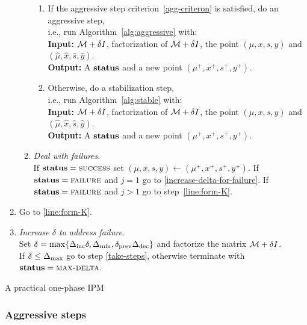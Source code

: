 \documentclass{article}
\begin{document}
\begin{algorithm}[H]
\begin{enumerate}[label*=A.{\arabic*}]
\begin{enumerate}[label*=.{\arabic*}]
\begin{enumerate}[label=-Case {\Roman*}]
\item If the aggressive step criterion~\eqref{agg-criteron} is satisfied, do an aggressive step, \\
i.e., run Algorithm~\ref{alg:aggressive} with: \\
\hspace*{0.1cm}  \textbf{Input:} $\mathcal{M} + \delta I$, factorization of $\mathcal{M} + \delta I$, the point $(\mu, x, s, y)$ and $(\hat{\mu}, \hat{x}, \hat{s}, \hat{y})$. \\
\hspace*{0.1cm}  \textbf{Output:} A $\textbf{status}$ and a new point $(\mu^{+},x^{+},s^{+},y^{+})$.
\item Otherwise, do a stabilization step, \\
i.e., run Algorithm~\ref{alg:stable} with: \\
\hspace*{0.1cm} \textbf{Input:} $\mathcal{M} + \delta I$, factorization of $\mathcal{M} + \delta I$, the point $(\mu, x, s, y)$ and $(\hat{\mu}, \hat{x}, \hat{s}, \hat{y})$. \\
\hspace*{0.1cm} \textbf{Output:} A $\textbf{status}$ and a new point $(\mu^{+},x^{+},s^{+},y^{+})$.
\end{enumerate}
\item \emph{Deal with failures}. \\
If $\textbf{status} = \textsc{success}$ set $(\mu, x, s, y) \gets ( \mu^{+}, x^{+},s^{+},y^{+})$. If $\textbf{status} = \textsc{failure}$ and $j = 1$ go to \eqref{increase-delta-for-failure}.  If $\textbf{status} = \textsc{failure}$ and $j > 1$ go to step~\eqref{line:form-K}.
\end{enumerate}
\item 
Go to \eqref{line:form-K}.
\item \label{increase-delta-for-failure} \emph{Increase $\delta$ to address failure.} \\
Set $\delta = \max\{\Delta_{\text{inc}} \delta, \Delta_{\min}, \delta_{\text{prev}} \Delta_{\text{dec}} \}$ and factorize the matrix $\mathcal{M} + \delta I$. \\
If $\delta \le \Delta_{\max}$ go to step \eqref{take-steps}, otherwise terminate with $\textbf{status} = \textsc{max-delta}$.
\end{enumerate}
\caption{A practical one-phase IPM}\label{one-phase-IPM}
\end{algorithm}


\subsubsection{Aggressive steps}
\end{document}
